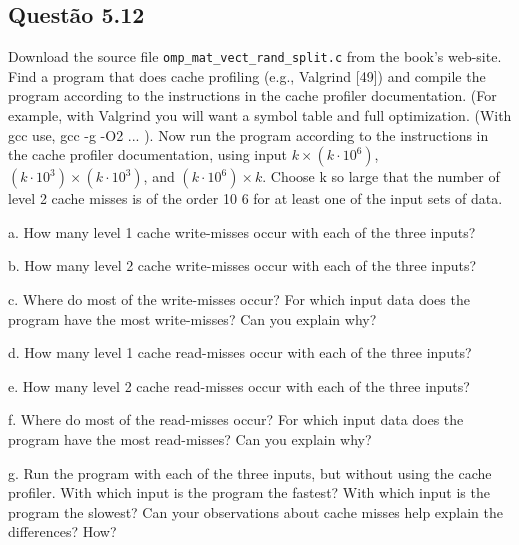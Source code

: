 
\subsection{Questão 5.12}

Download the source file \texttt{omp\_mat\_vect\_rand\_split.c} from the book’s web-site. Find a program that does cache profiling (e.g., Valgrind [49]) and compile the program according to the instructions in the cache profiler documentation. (For example, with Valgrind you will want a symbol table and full optimization. (With gcc use, gcc -g -O2 ... ). Now run the  program according to the instructions in the cache profiler documentation, using input $k \times (k \cdot 10^{6} )$, $(k \cdot 10^{3} ) \times (k \cdot 10^{3})$, and $(k \cdot 10^{6} ) \times k$. Choose k so large that the number of level 2 cache misses is of the order 10 6 for at least one of the input sets of data.

a. How many level 1 cache write-misses occur with each of the three inputs?

b. How many level 2 cache write-misses occur with each of the three inputs?

c. Where do most of the write-misses occur? For which input data does the program have the most write-misses? Can you explain why?

d. How many level 1 cache read-misses occur with each of the three inputs?

e. How many level 2 cache read-misses occur with each of the three inputs?

f. Where do most of the read-misses occur? For which input data does the program have the most read-misses? Can you explain why?

g. Run the program with each of the three inputs, but without using the cache profiler. With which input is the program the fastest? With which input is the program the slowest? Can your observations about cache misses help
explain the differences? How?


